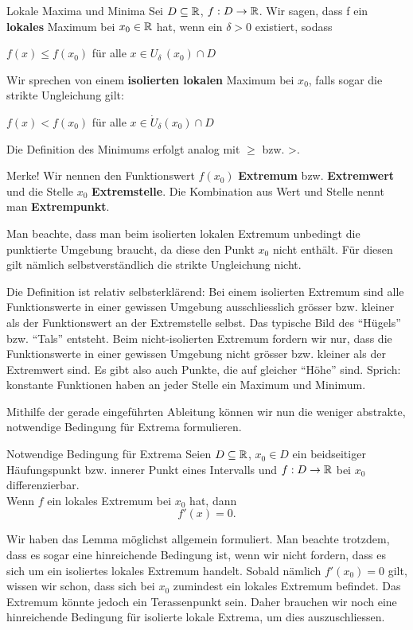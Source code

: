 \begin{definition}{Lokale Maxima und Minima}{}
Sei $D \subseteq \mathbb{R}$, $f:D \to \mathbb{R}$. Wir sagen, dass f ein \textbf{lokales} Maximum bei $x_0 \in \mathbb{R}$ hat, wenn ein $\delta > 0$ existiert, sodass
\begin{center}
$f(x) \leq f(x_0)$ für alle $x \in U_\delta\,(x_0) \cap D$
\end{center}
Wir sprechen von einem \textbf{isolierten lokalen} Maximum bei $x_0$, falls sogar die strikte Ungleichung gilt:
\begin{center}
$f(x)<f(x_0)$ für alle $x\in\dot{U}_\delta(x_0) \cap D$    
\end{center}
Die Definition des Minimums erfolgt analog mit $\geq$ bzw. >.


Merke! Wir nennen den Funktionswert $f(x_0)$ \textbf{Extremum} bzw. \textbf{Extremwert} und die Stelle $x_0$ \textbf{Extremstelle}. Die Kombination aus Wert und Stelle nennt man \textbf{Extrempunkt}.  
\end{definition}
\begin{remark}
Man beachte, dass man beim isolierten lokalen Extremum unbedingt die punktierte Umgebung braucht, da diese den Punkt $x_0$ nicht enthält. Für diesen gilt nämlich selbstverständlich die strikte Ungleichung nicht. 
\end{remark}
Die Definition ist relativ selbsterklärend: Bei einem isolierten Extremum sind alle Funktionswerte in einer gewissen Umgebung ausschliesslich grösser bzw. kleiner als der Funktionswert an der Extremstelle selbst. Das typische Bild des ``Hügels'' bzw. ``Tals'' entsteht. Beim nicht-isolierten Extremum fordern wir nur, dass die Funktionswerte in einer gewissen Umgebung nicht grösser bzw. kleiner als der Extremwert sind. Es gibt also auch Punkte, die auf gleicher ``Höhe'' sind. Sprich: konstante Funktionen haben an jeder Stelle ein Maximum und Minimum.

Mithilfe der gerade eingeführten Ableitung können wir nun die weniger abstrakte, notwendige Bedingung für Extrema formulieren. 

\begin{lemma}{Notwendige Bedingung für Extrema}{}
Seien $D \subseteq \mathbb{R}$, $x_0 \in D$ ein beidseitiger Häufungspunkt bzw. innerer Punkt eines Intervalls und $f:D \to \mathbb{R} $ bei $x_0$ differenzierbar.\\
Wenn $f$ ein lokales Extremum bei $x_0$ hat, dann $$f'(x)=0.$$  
\end{lemma}
\begin{remark}
Wir haben das Lemma möglichst allgemein formuliert. Man beachte trotzdem, dass es sogar eine hinreichende Bedingung ist, wenn wir nicht fordern, dass es sich um ein isoliertes lokales Extremum handelt. Sobald nämlich $f'(x_0)=0$ gilt, wissen wir schon, dass sich bei $x_0$ zumindest ein lokales Extremum befindet. Das Extremum könnte jedoch ein Terassenpunkt sein. Daher brauchen wir noch eine hinreichende Bedingung für isolierte lokale Extrema, um dies auszuschliessen. 
\end{remark}

